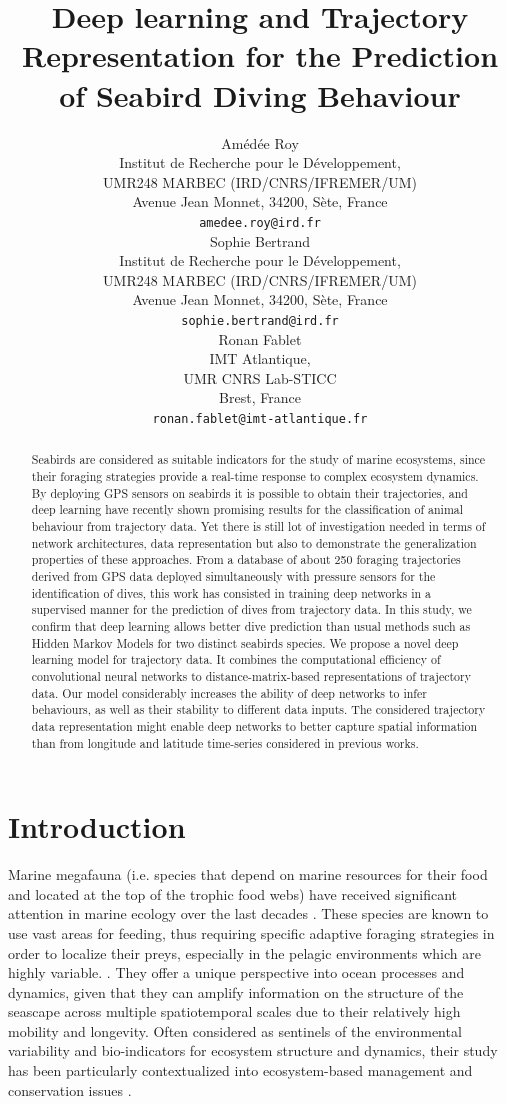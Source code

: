 \documentclass{article}
\title{Deep learning and Trajectory Representation for the Prediction of Seabird Diving Behaviour}
\author{
  Amédée Roy \\
  Institut de Recherche pour le Développement,\\
  UMR248 MARBEC (IRD/CNRS/IFREMER/UM)\\
  Avenue Jean Monnet, 34200, Sète, France \\
  \texttt{amedee.roy@ird.fr} \\
   \And
  Sophie Bertrand \\
  Institut de Recherche pour le Développement,\\
  UMR248 MARBEC (IRD/CNRS/IFREMER/UM)\\
  Avenue Jean Monnet, 34200, Sète, France \\
  \texttt{sophie.bertrand@ird.fr} \\
  \And
  Ronan Fablet \\
  IMT Atlantique,\\
  UMR CNRS Lab-STICC\\
  Brest, France \\
  \texttt{ronan.fablet@imt-atlantique.fr} \\
}
\begin{document}
\maketitle
\linenumbers
\doublespacing


\begin{abstract}
Seabirds are considered as suitable indicators for the study of marine ecosystems, since their foraging strategies provide a real-time response to complex ecosystem dynamics. By deploying GPS sensors on seabirds it is  possible to obtain their trajectories, and deep learning have recently shown promising results for the classification of animal behaviour from trajectory data. Yet there is still lot of investigation needed in terms of network architectures, data representation but also to demonstrate the generalization properties of these approaches. From a database of about 250 foraging trajectories derived from GPS data deployed simultaneously with pressure sensors for the identification of dives, this work has consisted in training deep networks in a supervised manner for the prediction of dives from trajectory data. In this study, we confirm that deep learning allows better dive prediction than usual methods such as Hidden Markov Models for two distinct seabirds species. We propose a novel deep learning model for trajectory data. It combines the computational efficiency of convolutional neural networks to distance-matrix-based representations of trajectory data. Our model considerably increases the ability of deep networks to infer behaviours, as well as their stability to different data inputs. The considered trajectory data representation might enable deep networks to better capture spatial information than from longitude and latitude time-series considered in previous works.
\end{abstract}


\newpage

\section{Introduction}
Marine megafauna (i.e. species that depend on marine resources for their food and located at the top of the trophic food webs) have received significant attention in marine ecology over the last decades \cite{authier_conservation_2017}.
These species are known to use vast areas for feeding, thus requiring specific adaptive foraging strategies in order to localize their preys, especially in the pelagic environments which are highly variable. \cite{hazen_marine_2019}.
They offer a unique perspective into ocean processes and dynamics, given that they can  amplify  information on the structure of the seascape across  multiple spatiotemporal scales due to their relatively high mobility and longevity.
Often considered as sentinels of the environmental variability and bio-indicators for ecosystem structure and dynamics, their study has been particularly contextualized into ecosystem-based management and conservation issues \cite{lascelles_migratory_2014, hooker_marine_2004}.
\end{document}
